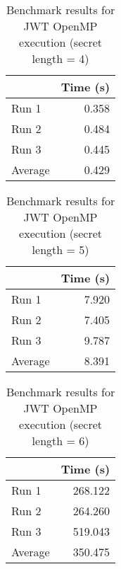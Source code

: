 \documentclass[12pt]{article}
\begin{document}
\begin{table}[H]
  \centering
  \begin{tabular}{lr}
    & {\bf Time (s)} \\
    \hline
    Run 1 & 0.358 \\
    Run 2 & 0.484 \\
    Run 3 & 0.445 \\
    \hline
    Average & 0.429 \\
  \end{tabular}
  \caption{Benchmark results for JWT OpenMP execution (secret length = 4)}
  \label{tbl-zeta-openmp}
\end{table}

\begin{table}[H]
  \centering
  \begin{tabular}{lr}
    & {\bf Time (s)} \\
    \hline
    Run 1 & 7.920 \\
    Run 2 & 7.405 \\
    Run 3 & 9.787 \\
    \hline
    Average & 8.391 \\
  \end{tabular}
  \caption{Benchmark results for JWT OpenMP execution (secret length = 5)}
  \label{tbl-zeta-openmp}
\end{table}


\begin{table}[H]
  \centering
  \begin{tabular}{lr}
    & {\bf Time (s)} \\
    \hline
    Run 1 & 268.122 \\
    Run 2 & 264.260 \\
    Run 3 & 519.043 \\
    \hline
    Average & 350.475 \\
  \end{tabular}
  \caption{Benchmark results for JWT OpenMP execution (secret length = 6)}
  \label{tbl-zeta-openmp}
\end{table}
\\
\end{document}
